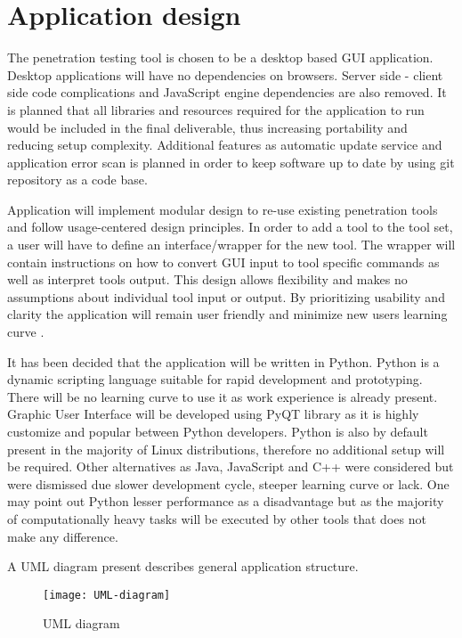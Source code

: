 



\section{Application design}
The penetration testing tool is chosen to be a desktop based GUI application. Desktop applications will have no dependencies on browsers. Server side - client side code complications and JavaScript engine dependencies are also removed. It is planned that all libraries and resources required for the application to run would be included in the final deliverable, thus increasing portability and reducing setup complexity. Additional features as automatic update service and application error scan is planned in order to keep software up to date by using git repository as a code base.

Application will implement modular design to re-use existing penetration tools and follow usage-centered design principles. In order to add a tool to the tool set, a user will have to define an interface/wrapper for the new tool. The wrapper will contain instructions on how to convert GUI input to tool specific commands as well as interpret tools output. This design allows flexibility and makes no assumptions about individual tool input or output. By prioritizing usability and clarity the application will remain user friendly and minimize new users learning curve \cite{user}.

It has been decided that the application will be written in Python. Python is a dynamic scripting language suitable for rapid development and prototyping. There will be no learning curve to use it as work experience is already present. Graphic User Interface will be developed using PyQT library as it is highly customize and popular between Python developers. Python is also by default present in the majority of Linux distributions, therefore no additional setup will be required. Other alternatives as Java, JavaScript and C++ were considered but were dismissed due slower development cycle, steeper learning curve or lack. One may point out Python lesser performance as a disadvantage but as the majority of computationally heavy tasks will be executed by other tools that does not make any difference.

A UML diagram present describes general application structure.

\begin{figure}[h!]
\caption{UML diagram}
\texttt{[image: UML-diagram]}
\centering
\end{figure}

